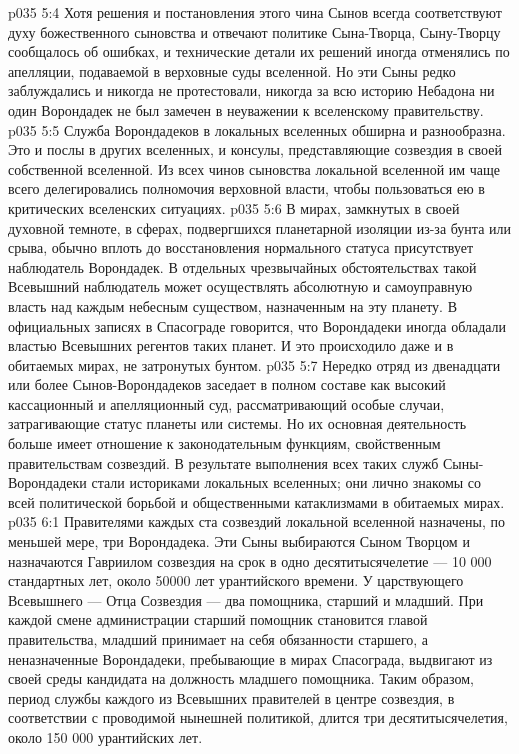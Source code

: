 \vs p035 5:4 Хотя решения и постановления этого чина Сынов всегда соответствуют духу божественного сыновства и отвечают политике Сына\hyp{}Творца, Сыну\hyp{}Творцу сообщалось об ошибках, и технические детали их решений иногда отменялись по апелляции, подаваемой в верховные суды вселенной. Но эти Сыны редко заблуждались и никогда не протестовали, никогда за всю историю Небадона ни один Ворондадек не был замечен в неуважении к вселенскому правительству.
\vs p035 5:5 Служба Ворондадеков в локальных вселенных обширна и разнообразна. Это и послы в других вселенных, и консулы, представляющие созвездия в своей собственной вселенной. Из всех чинов сыновства локальной вселенной им чаще всего делегировались полномочия верховной власти, чтобы пользоваться ею в критических вселенских ситуациях.
\vs p035 5:6 В мирах, замкнутых в своей духовной темноте, в сферах, подвергшихся планетарной изоляции из\hyp{}за бунта или срыва, обычно вплоть до восстановления нормального статуса присутствует наблюдатель Ворондадек. В отдельных чрезвычайных обстоятельствах такой Всевышний наблюдатель может осуществлять абсолютную и самоуправную власть над каждым небесным существом, назначенным на эту планету. В официальных записях в Спасограде говорится, что Ворондадеки иногда обладали властью Всевышних регентов таких планет. И это происходило даже и в обитаемых мирах, не затронутых бунтом.
\vs p035 5:7 Нередко отряд из двенадцати или более Сынов\hyp{}Ворондадеков заседает в полном составе как высокий кассационный и апелляционный суд, рассматривающий особые случаи, затрагивающие статус планеты или системы. Но их основная деятельность больше имеет отношение к законодательным функциям, свойственным правительствам созвездий. В результате выполнения всех таких служб Сыны\hyp{}Ворондадеки стали историками локальных вселенных; они лично знакомы со всей политической борьбой и общественными катаклизмами в обитаемых мирах.
\vs p035 6:1 Правителями каждых ста созвездий локальной вселенной назначены, по меньшей мере, три Ворондадека. Эти Сыны выбираются Сыном Творцом и назначаются Гавриилом  созвездия на срок в одно десятитысячелетие --- 10 000 стандартных лет, около 50000 лет урантийского времени. У царствующего Всевышнего --- Отца Созвездия --- два помощника, старший и младший. При каждой смене администрации старший помощник становится главой правительства, младший принимает на себя обязанности старшего, а неназначенные Ворондадеки, пребывающие в мирах Спасограда, выдвигают из своей среды кандидата на должность младшего помощника. Таким образом, период службы каждого из Всевышних правителей в центре созвездия, в соответствии с проводимой нынешней политикой, длится три десятитысячелетия, около 150 000 урантийских лет.
